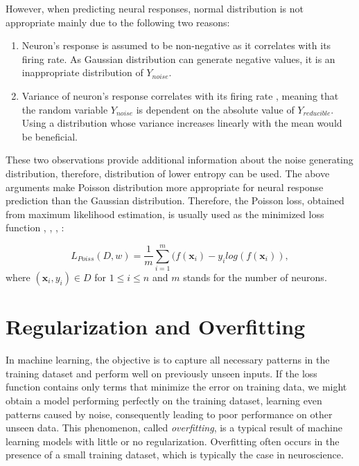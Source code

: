 However, when predicting neural responses, normal distribution is not appropriate mainly due to the following two reasons:
\begin{enumerate}
	\item Neuron’s response is assumed to be non-negative as it correlates with its firing rate. As Gaussian distribution can generate negative values, it is an inappropriate distribution of $Y_{noise}$.
	\item Variance of neuron’s response correlates with its firing rate \citep{goris2014partitioning}, meaning that the random variable $Y_{noise}$ is dependent on the absolute value of $Y_{reducible}$. Using a distribution whose variance increases linearly with the mean would be beneficial.
\end{enumerate}


These two observations provide additional information about the noise generating distribution, therefore, distribution of lower entropy can be used. The above arguments make Poisson distribution more appropriate for neural response prediction than the Gaussian distribution. Therefore, the Poisson loss, obtained from maximum likelihood estimation, is usually used as the minimized loss function \citep{cadena2019deep}, \citep{klindt2017neural}, \citep{sinz2018stimulus}, \citep{lurz2021generalization}:

\begin{defn}\label{def01:6}
	\begin{equation}
		L_{Poiss}(D, w) = \frac{1}{m} \sum_{i=1}^m (f(\textbf{x}_i) - y_i log(f(\textbf{x}_i)),
	\end{equation}
	where $(\textbf{x}_i, y_i) \in D$ for $1 \leq i \leq n$ and $m$ stands for the number of neurons.
\end{defn}


\section{Regularization and Overfitting}

In machine learning, the objective is to capture all necessary patterns in the training dataset and perform well on previously unseen inputs. If the loss function contains only terms that minimize the error on training data, we might obtain a model performing perfectly on the training dataset, learning even patterns caused by noise, consequently leading to poor performance on other unseen data. This phenomenon, called \emph{overfitting}, is a typical result of machine learning models with little or no regularization. Overfitting often occurs in the presence of a small training dataset, which is typically the case in neuroscience.


